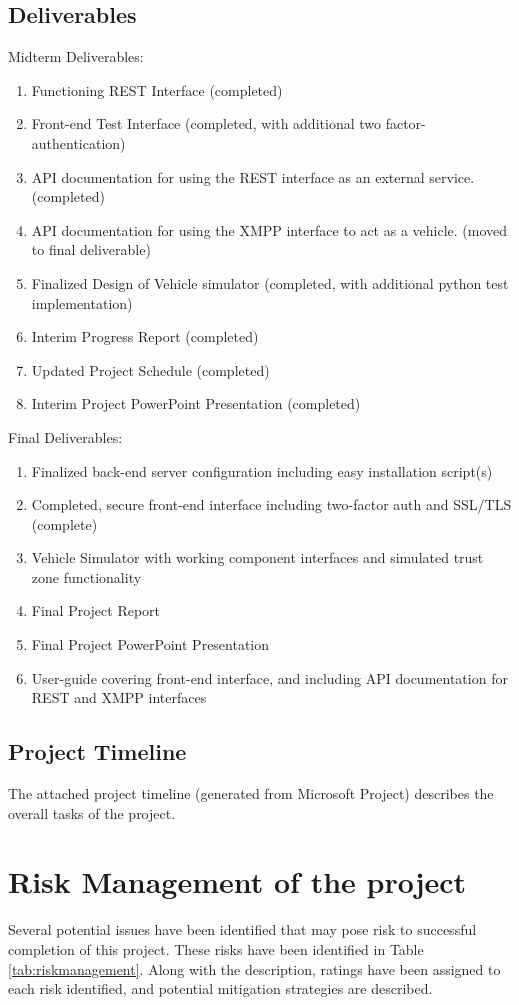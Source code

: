 \documentclass[conference,12pt]{IEEEtran}
\begin{document}
\subsection{Deliverables}

Midterm Deliverables:
\begin{enumerate}
\item Functioning REST Interface (completed)
\item Front-end Test Interface (completed, with additional two factor-authentication)
\item API documentation for using the REST interface as an external service. (completed)
\item API documentation for using the XMPP interface to act as a vehicle. (moved to final deliverable)
\item Finalized Design of Vehicle simulator (completed, with additional python test implementation)
\item Interim Progress Report (completed)
\item Updated Project Schedule (completed)
\item Interim Project PowerPoint Presentation (completed)
\end{enumerate}

Final Deliverables:
\begin{enumerate}
\item Finalized back-end server configuration including easy installation script(s)
\item Completed, secure front-end interface including two-factor auth and
    SSL/TLS (complete)
\item Vehicle Simulator with working component interfaces and simulated trust zone functionality
\item Final Project Report
\item Final Project PowerPoint Presentation
\item User-guide covering front-end interface, and including API documentation for REST and XMPP interfaces 
\end{enumerate}


\subsection{Project Timeline}
The attached project timeline (generated from Microsoft Project) describes the
overall tasks of the project.

\section{Risk Management of the project}
Several potential issues have been identified that may pose risk to successful
completion of this project. These risks have been identified in Table
\ref{tab:riskmanagement}. Along with the description, ratings have been assigned
to each risk identified, and potential mitigation strategies are described.
\end{document}
